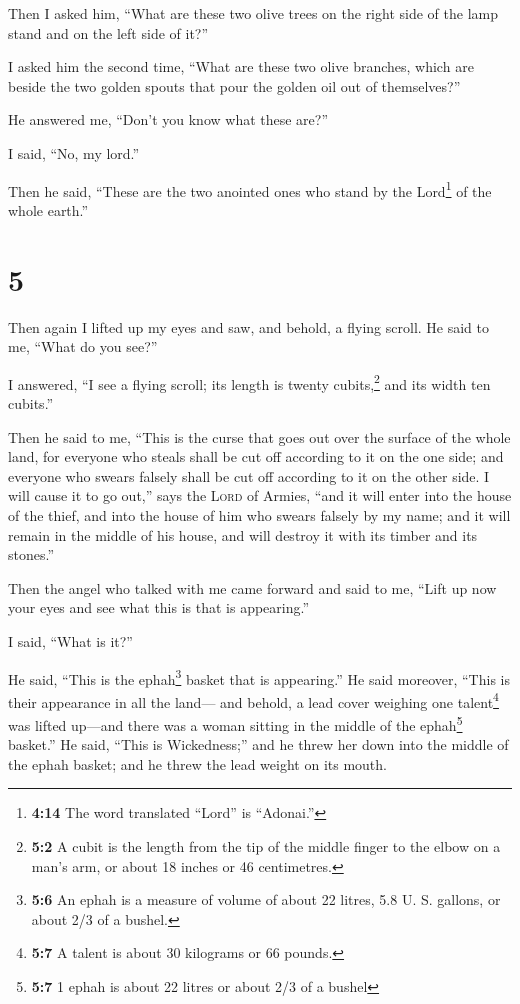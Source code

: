 Then I asked him, ``What are these two olive trees on
the right side of the lamp stand and on the left side of it?''

 I asked him the second time, ``What are these two olive
branches, which are beside the two golden spouts that pour the golden
oil out of themselves?''

 He answered me, ``Don't you know what these are?''

I said, ``No, my lord.''

 Then he said, ``These are the two anointed ones who
stand by the Lord\footnote{\textbf{4:14} The word translated ``Lord'' is
  ``Adonai.''} of the whole earth.''

\hypertarget{section-4}{%
\section{5}\label{section-4}}

 Then again I lifted up my eyes and saw, and behold, a
flying scroll.  He said to me, ``What do you see?''

I answered, ``I see a flying scroll; its length is twenty
cubits,\footnote{\textbf{5:2} A cubit is the length from the tip of the
  middle finger to the elbow on a man's arm, or about 18 inches or 46
  centimetres.} and its width ten cubits.''

 Then he said to me, ``This is the curse that goes out
over the surface of the whole land, for everyone who steals shall be cut
off according to it on the one side; and everyone who swears falsely
shall be cut off according to it on the other side.  I
will cause it to go out,'' says the \textsc{Lord} of Armies, ``and it
will enter into the house of the thief, and into the house of him who
swears falsely by my name; and it will remain in the middle of his
house, and will destroy it with its timber and its stones.''

 Then the angel who talked with me came forward and said
to me, ``Lift up now your eyes and see what this is that is appearing.''

 I said, ``What is it?''

He said, ``This is the ephah\footnote{\textbf{5:6} An ephah is a measure
  of volume of about 22 litres, 5.8 U. S. gallons, or about 2/3 of a
  bushel.} basket that is appearing.'' He said moreover, ``This is their
appearance in all the land---  and behold, a lead cover
weighing one talent\footnote{\textbf{5:7} A talent is about 30 kilograms
  or 66 pounds.} was lifted up---and there was a woman sitting in the
middle of the ephah\footnote{\textbf{5:7} 1 ephah is about 22 litres or
  about 2/3 of a bushel} basket.''  He said, ``This is
Wickedness;'' and he threw her down into the middle of the ephah basket;
and he threw the lead weight on its mouth.

